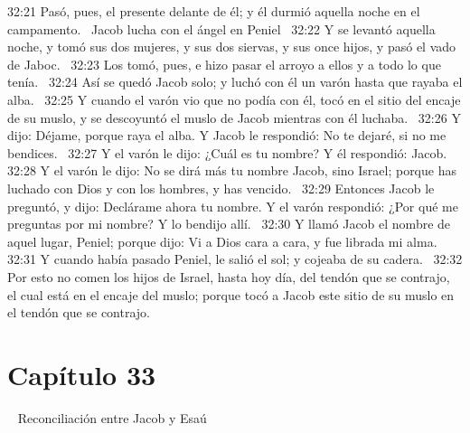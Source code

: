 32:21 Pasó, pues, el presente delante de él; y él durmió aquella noche en el campamento.  
Jacob lucha con el ángel en Peniel  
32:22 Y se levantó aquella noche, y tomó sus dos mujeres, y sus dos siervas, y sus once hijos, y pasó el vado de Jaboc.  
32:23 Los tomó, pues, e hizo pasar el arroyo a ellos y a todo lo que tenía.  
32:24 Así se quedó Jacob solo; y luchó con él un varón hasta que rayaba el alba.  
32:25 Y cuando el varón vio que no podía con él, tocó en el sitio del encaje de su muslo, y se descoyuntó el muslo de Jacob mientras con él luchaba.  
32:26 Y dijo: Déjame, porque raya el alba. Y Jacob le respondió: No te dejaré, si no me bendices.  
32:27 Y el varón le dijo: ¿Cuál es tu nombre? Y él respondió: Jacob.  
32:28 Y el varón le dijo: No se dirá más tu nombre Jacob, sino Israel; porque has luchado con Dios y con los hombres, y has vencido.  
32:29 Entonces Jacob le preguntó, y dijo: Declárame ahora tu nombre. Y el varón respondió: ¿Por qué me preguntas por mi nombre? Y lo bendijo allí.  
32:30 Y llamó Jacob el nombre de aquel lugar, Peniel; porque dijo: Vi a Dios cara a cara, y fue librada mi alma.  
32:31 Y cuando había pasado Peniel, le salió el sol; y cojeaba de su cadera.  
32:32 Por esto no comen los hijos de Israel, hasta hoy día, del tendón que se contrajo, el cual está en el encaje del muslo; porque tocó a Jacob este sitio de su muslo en el tendón que se contrajo.  
\section*{Capítulo 33} 
Reconciliación entre Jacob y Esaú  


